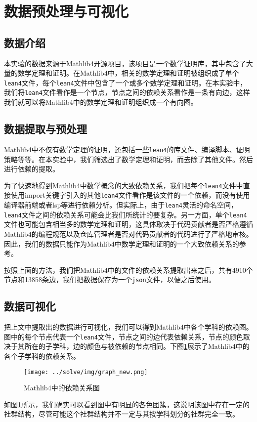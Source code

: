 \section{数据预处理与可视化}

\subsection{数据介绍}

本实验的数据来源于Mathlib4开源项目\cite{mathlib4}，该项目是一个数学证明库，其中包含了大量的数学定理和证明。在Mathlib4中，相关的数学定理和证明被组织成了单个\texttt{lean4}文件，每个\texttt{lean4}文件中包含了一个或多个数学定理和证明。在本实验中，我们将\texttt{lean4}文件看作是一个节点，节点之间的依赖关系看作是一条有向边，这样我们就可以将Mathlib4中的数学定理和证明组织成一个有向图。

\subsection{数据提取与预处理}

Mathlib4中不仅有数学定理的证明，还包括一些\texttt{lean4}的库文件、编译脚本、证明策略等等。在本实验中，我们筛选出了数学定理和证明，而去除了其他文件。然后进行依赖的提取。

为了快速地得到Mathlib4中数学概念的大致依赖关系，我们把每个\texttt{\texttt{lean4}}文件中直接使用import关键字引入的其他\texttt{lean4}文件看作是该文件的一个依赖，而没有使用编译器前端或者lsp等进行依赖分析。但实际上，由于\texttt{lean4}灵活的命名空间，\texttt{lean4}文件之间的依赖关系可能会比我们所统计的要复杂。另一方面，单个\texttt{lean4}文件也可能包含相当多的数学定理和证明，这具体取决于代码贡献者是否严格遵循Mathlib4的编程规范以及仓库管理者是否对代码贡献者的代码进行了严格地审核。因此，我们的数据只能作为Mathlib4中数学定理和证明的一个大致依赖关系的参考。

按照上面的方法，我们把Mathlib4中的文件的依赖关系提取出来之后，共有4910个节点和13858条边，我们把数据保存为一个\texttt{json}文件，以便之后使用。

\subsection{数据可视化}

把上文中提取出的数据进行可视化，我们可以得到Mathlib4中各个学科的依赖图。图中的每个节点代表一个\texttt{lean4}文件，节点之间的边代表依赖关系，节点的颜色取决于其所在的子学科，边的颜色与被依赖的节点相同。下图\ref{fig:dependency}展示了Mathlib4中的各个子学科的依赖关系。

\begin{figure}[htb]
    \centering
    \texttt{[image: ../solve/img/graph\_new.png]}
    \caption{Mathlib4中的依赖关系图}
    \label{fig:dependency}
\end{figure}

如图\ref{fig:dependency}所示，我们确实可以看到图中有明显的各色团簇，这说明该图中存在一定的社群结构，尽管可能这个社群结构并不一定与其按学科划分的社群完全一致。
